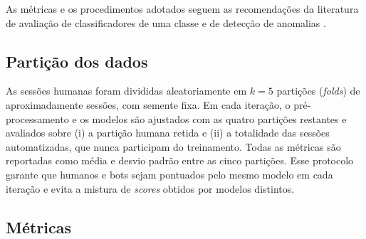 As métricas e os procedimentos adotados seguem as recomendações da literatura de avaliação de classificadores de uma classe e de detecção de anomalias \cite{marques2023, demsar2006}.

\subsection{Partição dos dados}
\label{subsec:particao}

As sessões humanas foram divididas aleatoriamente em $k = 5$ partições (\textit{folds}) de aproximadamente  sessões, com semente fixa. Em cada iteração, o pré-processamento e os modelos são ajustados com as quatro partições restantes e avaliados sobre (i) a partição humana retida e (ii) a totalidade das sessões automatizadas, que nunca participam do treinamento. Todas as métricas são reportadas como média e desvio padrão entre as cinco partições. Esse protocolo garante que humanos e bots sejam pontuados pelo mesmo modelo em cada iteração e evita a mistura de \textit{scores} obtidos por modelos distintos.

\subsection{Métricas}

